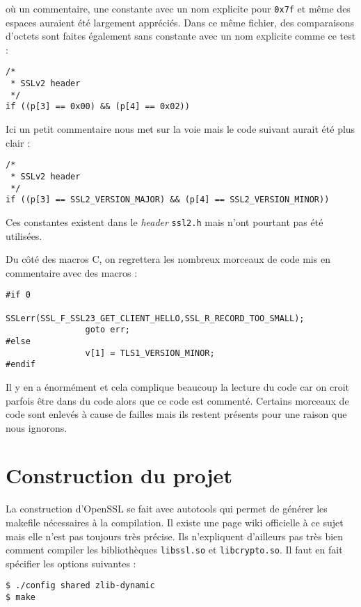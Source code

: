 où un commentaire, une constante avec un nom explicite pour \verb+0x7f+ et même des espaces auraient été largement appréciés. Dans ce même fichier, des comparaisons d'octets sont faites également sans constante avec un nom explicite comme ce test :

\begin{lstlisting}[style=customc,label=badcodetest, caption=Exemple de mauvais test d'OpenSSL]
/*
 * SSLv2 header
 */
if ((p[3] == 0x00) && (p[4] == 0x02))
\end{lstlisting}

Ici un petit commentaire nous met sur la voie mais le code suivant aurait été plus clair :
\begin{lstlisting}[style=customc,label=badcodetestfixed, caption=Exemple de mauvais test d'OpenSSL corrigé]
/*
 * SSLv2 header
 */
if ((p[3] == SSL2_VERSION_MAJOR) && (p[4] == SSL2_VERSION_MINOR))
\end{lstlisting}

Ces constantes existent dans le \textit{header} \verb+ssl2.h+ mais n'ont pourtant pas été utilisées.

Du côté des macros C, on regrettera les nombreux morceaux de code mis en commentaire avec des  macros :

\begin{lstlisting}[style=customc,label=badcodeif0, caption=Exemple de mauvais \#if 0 d'OpenSSL]
#if 0
				SSLerr(SSL_F_SSL23_GET_CLIENT_HELLO,SSL_R_RECORD_TOO_SMALL);
				goto err;
#else
				v[1] = TLS1_VERSION_MINOR;
#endif
\end{lstlisting}

Il y en a énormément et cela complique beaucoup la lecture du code car on croit parfois être dans du code alors que ce code est commenté. Certains morceaux de code sont enlevés à cause de failles mais ils restent présents pour une raison que nous ignorons.


\section{Construction du projet}
La construction d'OpenSSL se fait avec autotools qui permet de générer les makefile nécessaires à la compilation. Il existe une page wiki officielle à ce sujet mais elle n'est pas toujours très précise. Ils n'expliquent d'ailleurs pas très bien comment compiler les bibliothèques \verb+libssl.so+ et \verb+libcrypto.so+. Il faut en fait spécifier les options suivantes :
\begin{verbatim}
$ ./config shared zlib-dynamic
$ make
\end{verbatim}

